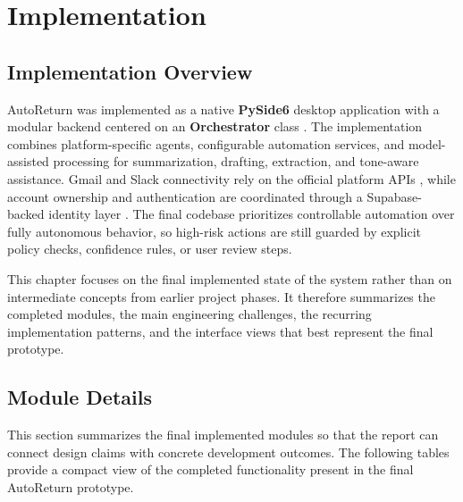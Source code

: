 \chapter{Implementation}
\label{sec:implementation}

\section{Implementation Overview}
AutoReturn was implemented as a native \textbf{PySide6} desktop application with a modular backend centered on an \textbf{Orchestrator} class \cite{pyside2024}. The implementation combines platform-specific agents, configurable automation services, and model-assisted processing for summarization, drafting, extraction, and tone-aware assistance. Gmail and Slack connectivity rely on the official platform APIs \cite{gmail2023,slack2023}, while account ownership and authentication are coordinated through a Supabase-backed identity layer \cite{supabase2024}. The final codebase prioritizes controllable automation over fully autonomous behavior, so high-risk actions are still guarded by explicit policy checks, confidence rules, or user review steps.

This chapter focuses on the final implemented state of the system rather than on intermediate concepts from earlier project phases. It therefore summarizes the completed modules, the main engineering challenges, the recurring implementation patterns, and the interface views that best represent the final prototype.

\section{Module Details}
This section summarizes the final implemented modules so that the report can connect design claims with concrete development outcomes. The following tables provide a compact view of the completed functionality present in the final AutoReturn prototype.

